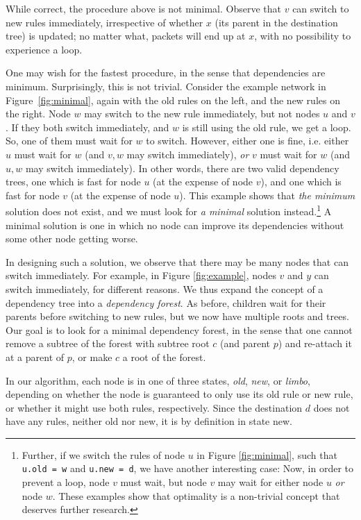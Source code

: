 While correct, the procedure above is not minimal. Observe that $v$ can switch to new rules immediately, irrespective of whether $x$ (its parent in the destination tree) is updated; no matter what, packets will end up at $x$, with no possibility to experience a loop. 

One may wish for the fastest procedure, in the sense that dependencies are minimum. Surprisingly, this is not trivial. Consider the example network in Figure~\ref{fig:minimal}, again with the old rules on the left, and the new rules on the right. Node $w$ may switch to the new rule immediately, but not nodes $u$ and $v$. If they both switch immediately, and $w$ is still using the old rule, we get a loop. So, one of them must wait for $w$ to switch. However, either one is fine, i.e. either $u$ must wait for $w$ (and $v,w$ may switch immediately), \emph{or} $v$ must wait for $w$ (and $u,w$ may switch immediately). In other words, there are two valid dependency trees, one which is fast for node $u$ (at the expense of node $v$), and one which is fast for node $v$ (at the expense of node $u$). 
This example shows that \emph{the minimum} solution does not exist, and we must look for \emph{a minimal} solution instead.\footnote{Further, if we switch the rules of node $u$ in Figure \ref{fig:minimal}, such that \texttt{u.old = w} and \texttt{u.new = d}, we have another interesting case: Now, in order to prevent a loop, node $v$ must wait, but node $v$ may wait for either node $u$ \emph{or} node $w$. These examples show that optimality is a non-trivial concept that deserves further research.}  A minimal solution is one in which no node can improve its dependencies without some other node getting worse.

In designing such a solution, we observe that there may be many nodes that can switch immediately. For example, in Figure \ref{fig:example}, nodes $v$ and $y$ can switch immediately, for different reasons. We thus expand the concept of a dependency tree into a \emph{dependency forest}. As before, children wait for their parents before switching to new rules, but we now have multiple roots and trees. Our goal is to look for a minimal dependency forest, in the sense that one cannot remove a subtree of the forest with subtree root $c$ (and parent $p$) and re-attach it at a parent of $p$, or make $c$ a root of the forest.  

In our algorithm, each node is in one of three states, \emph{old}, \emph{new}, or \emph{limbo}, depending on whether the node is guaranteed to only use its old rule or new rule, or whether it might use both rules, respectively. Since the destination $d$ does not have any rules, neither old nor new, it is by definition in state new.

